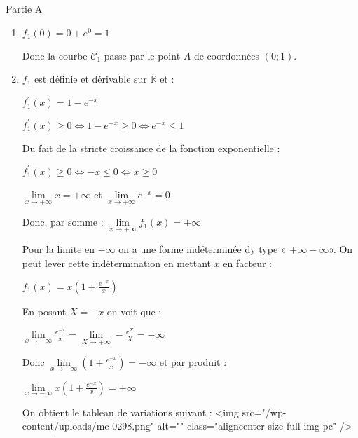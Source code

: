 \begin{corrige}
     \begin{h3}Partie A\end{h3}
     \begin{enumerate}
          \item
          $f_{1}\left(0\right)=0+e^{0}=1$
          \par
          Donc la courbe $\mathscr C_{1}$ passe par le point $A$ de coordonnées $\left(0 ; 1\right)$.
          \item
          $f_{1}$ est définie et dérivable sur $\mathbb{R}$ et :
          \par
          $f_{1}^{\prime}\left(x\right)=1-e^{-x}$
          \par
          $f_{1}^{\prime}\left(x\right) \geqslant  0  \Leftrightarrow   1-e^{-x} \geqslant 0  \Leftrightarrow  e^{-x}\leqslant 1$
          \par
          Du fait de la stricte croissance de la fonction exponentielle :
          \par
          $f_{1}^{\prime}\left(x\right) \geqslant  0  \Leftrightarrow   -x \leqslant  0   \Leftrightarrow  x\geqslant 0$
          \par
          $\lim\limits_{x\rightarrow +\infty }x= + \infty $ et $\lim\limits_{x\rightarrow +\infty }e^{-x}= 0$
          \par
          Donc, par somme : $\lim\limits_{x\rightarrow +\infty }f_{1}\left(x\right)= +\infty $
          \par
          Pour la limite en $-\infty $ on a une forme indéterminée dy type « $+\infty -\infty  $». On peut lever cette indétermination en mettant $x$ en facteur :
          \par
          $f_{1}\left(x\right)=x\left(1+\frac{e^{-x}}{x}\right)$
          \par
          En posant $X=-x$ on voit que :
          \par
          $\lim\limits_{x\rightarrow -\infty }\frac{e^{-x}}{x}= \lim\limits_{X\rightarrow +\infty }-\frac{e^{X}}{X} =-\infty $
          \par
          Donc $\lim\limits_{x\rightarrow -\infty }\left(1+\frac{e^{-x}}{x}\right)= -\infty $ et par produit :
          \par
          $\lim\limits_{x\rightarrow -\infty }x\left(1+\frac{e^{-x}}{x}\right)= +\infty $
          \par
          On obtient le tableau de variations suivant :
          <img src="/wp-content/uploads/mc-0298.png" alt="" class="aligncenter size-full  img-pc" />

\end{enumerate}
\end{corrige}
